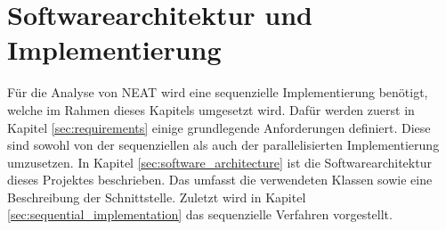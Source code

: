 \chapter{Softwarearchitektur und Implementierung}
\label{chap:software_architecture}
Für die Analyse von \ac{NEAT} wird eine sequenzielle Implementierung benötigt, welche im Rahmen dieses Kapitels umgesetzt wird. Dafür werden zuerst in Kapitel \ref{sec:requirements} einige grundlegende Anforderungen definiert. Diese sind sowohl von der sequenziellen als auch der parallelisierten Implementierung umzusetzen. In Kapitel \ref{sec:software_architecture} ist die Softwarearchitektur dieses Projektes beschrieben. Das umfasst die verwendeten Klassen sowie eine Beschreibung der Schnittstelle. Zuletzt wird in Kapitel \ref{sec:sequential_implementation} das sequenzielle Verfahren vorgestellt.


